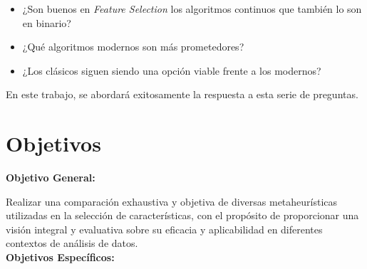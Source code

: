 \begin{itemize}
      \item ¿Son buenos en \textit{Feature Selection} los algoritmos continuos que también lo son en binario?
      \item ¿Qué algoritmos modernos son más prometedores?
      \item ¿Los clásicos siguen siendo una opción viable frente a los modernos?
\end{itemize}

En este trabajo, se abordará exitosamente la respuesta a esta serie de preguntas.

\section{Objetivos}
\textbf{Objetivo General:}

Realizar una comparación exhaustiva y objetiva de diversas metaheurísticas utilizadas en la
selección de características, con el propósito de proporcionar una visión integral y
evaluativa sobre su eficacia y aplicabilidad en diferentes contextos de análisis de
datos.\\[6pt]
\textbf{Objetivos Específicos:}


